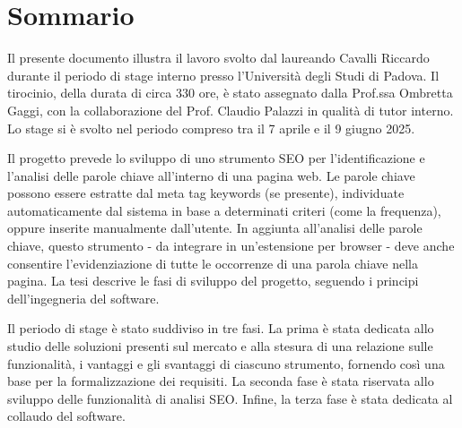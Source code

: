 \cleardoublepage
{}
{}
\begingroup
\let\clearpage\relax
\let\cleardoublepage\relax
\let\cleardoublepage\relax

\chapter*{Sommario}

\par Il presente documento illustra il lavoro svolto dal laureando Cavalli Riccardo durante il periodo di stage interno presso l’Università degli Studi di Padova. Il tirocinio, della durata di circa 330 ore, è stato assegnato dalla Prof.ssa Ombretta Gaggi, con la collaborazione del Prof. Claudio Palazzi in qualità di tutor interno. Lo stage si è svolto nel periodo compreso tra il 7 aprile e il 9 giugno 2025.

\vspace{10pt}
\par\noindent Il progetto prevede lo sviluppo di uno strumento SEO per l’identificazione e l’analisi delle parole chiave all’interno di una pagina web. Le parole chiave possono essere estratte dal meta tag keywords (se presente), individuate automaticamente dal sistema in base a determinati criteri (come la frequenza), oppure inserite manualmente dall’utente. In aggiunta all’analisi delle parole chiave, questo strumento - da integrare in un’estensione per browser - deve anche consentire l’evidenziazione di tutte le occorrenze di una parola chiave nella pagina. La tesi descrive le fasi di sviluppo del progetto, seguendo i principi dell’ingegneria del software.

\vspace{10pt}
\par\noindent Il periodo di stage è stato suddiviso in tre fasi. La prima è stata dedicata allo studio delle soluzioni presenti sul mercato e alla stesura di una relazione sulle funzionalità, i vantaggi e gli svantaggi di ciascuno strumento, fornendo così una base per la formalizzazione dei requisiti. La seconda fase è stata riservata allo sviluppo delle funzionalità di analisi SEO. Infine, la terza fase è stata dedicata al collaudo del software.




\endgroup

\vfill
